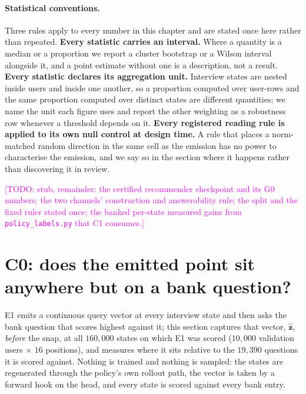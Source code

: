 \documentclass[11pt]{article}
\newcommand{\zz}{\mathbf{z}}
\newcommand{\zhat}{\hat{\zz}}
\newcommand{\todo}[1]{\textcolor{magenta}{[TODO: #1]}}
\begin{document}
\paragraph{Statistical conventions.} Three rules apply to every number in this chapter and are stated
once here rather than repeated. \textbf{Every statistic carries an interval.} Where a quantity is a
median or a proportion we report a cluster bootstrap or a Wilson interval alongside it, and a point
estimate without one is a description, not a result. \textbf{Every statistic declares its aggregation
unit.} Interview states are nested inside users and inside one another, so a proportion computed over
user-rows and the same proportion computed over distinct states are different quantities; we name the
unit each figure uses and report the other weighting as a robustness row whenever a threshold depends
on it. \textbf{Every registered reading rule is applied to its own null control at design time.} A
rule that places a norm-matched random direction in the same cell as the emission has no power to
characterise the emission, and we say so in the section where it happens rather than discovering it
in review.

\todo{stub, remainder: the certified recommender checkpoint and its G0 numbers; the two channels'
construction and answerability rule; the split and the fixed ruler stated once; the banked per-state
measured gains from \texttt{policy\_labels.py} that C1 consumes.}

\section{C0: does the emitted point sit anywhere but on a bank question?}
\label{sec:c0}

E1 emits a continuous query vector at every interview state and then asks the bank question that
scores highest against it; this section captures that vector, $\zhat$, \emph{before} the snap, at all
$160{,}000$ states on which E1 was scored ($10{,}000$ validation users $\times$ $16$ positions), and
measures where it sits relative to the $19{,}390$ questions it is scored against. Nothing is trained
and nothing is sampled: the states are regenerated through the policy's own rollout path, the vector
is taken by a forward hook on the head, and every state is scored against every bank entry.
\end{document}
